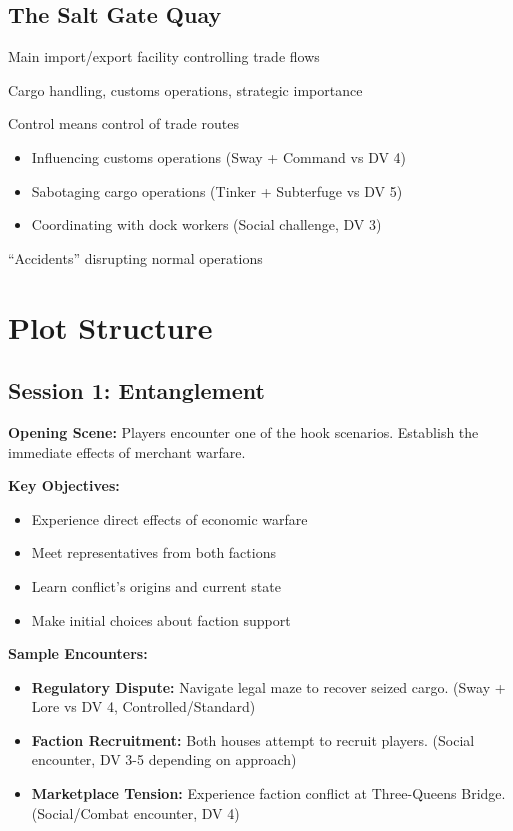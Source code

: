 \documentclass[11pt]{article}
\newenvironment{location}[1]{\begin{description}[leftmargin=*,style=standard]\item[\textbf{#1}]}{\end{description}}
\begin{document}
\subsection{The Salt Gate Quay}
\begin{location}{The Salt Gate Quay}
\item[Description:] Main import/export facility controlling trade flows
\item[Features:] Cargo handling, customs operations, strategic importance
\item[Strategic Value:] Control means control of trade routes
\item[Challenges:] 
  \begin{itemize}
    \item Influencing customs operations (Sway + Command vs DV 4)
    \item Sabotaging cargo operations (Tinker + Subterfuge vs DV 5)
    \item Coordinating with dock workers (Social challenge, DV 3)
  \end{itemize}
\item[Recent Issues:] ``Accidents'' disrupting normal operations
\end{location}

\section{Plot Structure}

\subsection{Session 1: Entanglement}

\textbf{Opening Scene:} Players encounter one of the hook scenarios. Establish the immediate effects of merchant warfare.

\textbf{Key Objectives:}
\begin{itemize}
\item Experience direct effects of economic warfare
\item Meet representatives from both factions
\item Learn conflict's origins and current state
\item Make initial choices about faction support
\end{itemize}

\textbf{Sample Encounters:}
\begin{itemize}
\item \textbf{Regulatory Dispute:} Navigate legal maze to recover seized cargo. (Sway + Lore vs DV 4, Controlled/Standard)
\item \textbf{Faction Recruitment:} Both houses attempt to recruit players. (Social encounter, DV 3-5 depending on approach)
\item \textbf{Marketplace Tension:} Experience faction conflict at Three-Queens Bridge. (Social/Combat encounter, DV 4)
\end{itemize}
\end{document}
